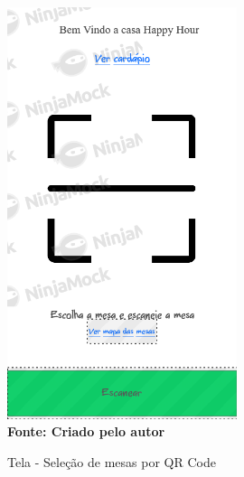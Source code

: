 \begin{figure}[ht]
	\centering	
	\caption[\hspace{0.1cm}]{Tela - Seleção de mesas por QR Code}
	\vspace{-0.4cm}
	\includegraphics[width=0.6\textwidth]{figuras/c_home.png}
	 \vspace{-0.2cm}
	\\\textbf{\footnotesize Fonte: Criado pelo autor }
	\label{fig:w1}
\end{figure}
\vspace{-0.5cm}


